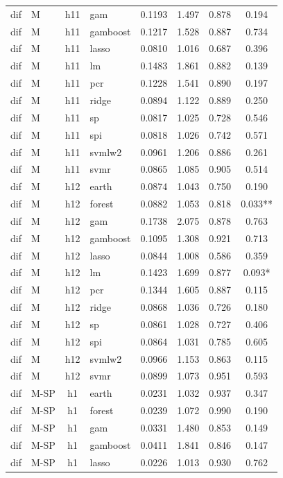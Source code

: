 \begin{ThreePartTable}
\begin{longtable}[t]{llclcccc}
dif & M & h11 & gam & 0.1193 & 1.497 & 0.878 & 0.194\\
dif & M & h11 & gamboost & 0.1217 & 1.528 & 0.887 & 0.734\\
dif & M & h11 & lasso & 0.0810 & 1.016 & 0.687 & 0.396\\
dif & M & h11 & lm & 0.1483 & 1.861 & 0.882 & 0.139\\
dif & M & h11 & pcr & 0.1228 & 1.541 & 0.890 & 0.197\\
dif & M & h11 & ridge & 0.0894 & 1.122 & 0.889 & 0.250\\
dif & M & h11 & sp & 0.0817 & 1.025 & 0.728 & 0.546\\
dif & M & h11 & spi & 0.0818 & 1.026 & 0.742 & 0.571\\
dif & M & h11 & svmlw2 & 0.0961 & 1.206 & 0.886 & 0.261\\
dif & M & h11 & svmr & 0.0865 & 1.085 & 0.905 & 0.514\\
\addlinespace
dif & M & h12 & earth & 0.0874 & 1.043 & 0.750 & 0.190\\
dif & M & h12 & forest & 0.0882 & 1.053 & 0.818 & 0.033**\\
dif & M & h12 & gam & 0.1738 & 2.075 & 0.878 & 0.763\\
dif & M & h12 & gamboost & 0.1095 & 1.308 & 0.921 & 0.713\\
dif & M & h12 & lasso & 0.0844 & 1.008 & 0.586 & 0.359\\
dif & M & h12 & lm & 0.1423 & 1.699 & 0.877 & 0.093*\\
dif & M & h12 & pcr & 0.1344 & 1.605 & 0.887 & 0.115\\
dif & M & h12 & ridge & 0.0868 & 1.036 & 0.726 & 0.180\\
dif & M & h12 & sp & 0.0861 & 1.028 & 0.727 & 0.406\\
dif & M & h12 & spi & 0.0864 & 1.031 & 0.785 & 0.605\\
dif & M & h12 & svmlw2 & 0.0966 & 1.153 & 0.863 & 0.115\\
dif & M & h12 & svmr & 0.0899 & 1.073 & 0.951 & 0.593\\
\addlinespace
dif & M-SP & h1 & earth & 0.0231 & 1.032 & 0.937 & 0.347\\
dif & M-SP & h1 & forest & 0.0239 & 1.072 & 0.990 & 0.190\\
dif & M-SP & h1 & gam & 0.0331 & 1.480 & 0.853 & 0.149\\
dif & M-SP & h1 & gamboost & 0.0411 & 1.841 & 0.846 & 0.147\\
dif & M-SP & h1 & lasso & 0.0226 & 1.013 & 0.930 & 0.762\\

\end{longtable}
\end{ThreePartTable}
